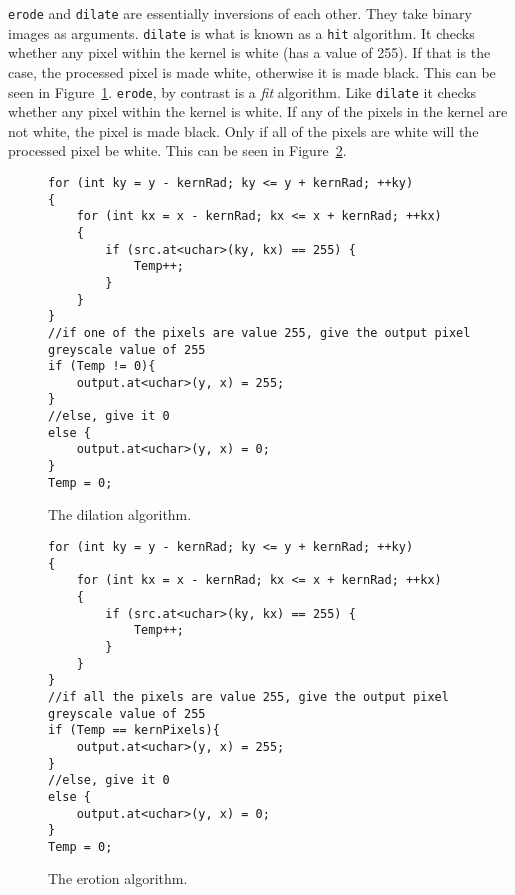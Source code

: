 \texttt{erode} and \texttt{dilate} are essentially inversions of each other. They take binary images as arguments. \texttt{dilate} is what is known as a \texttt{hit} algorithm. It checks whether any pixel within the kernel is white (has a value of 255). If that is the case, the processed pixel is made white, otherwise it is made black. This can be seen in Figure~\ref{fig:dilateAlgorith}. \texttt{erode}, by contrast is a \textit{fit} algorithm. Like \texttt{dilate} it checks whether any pixel within the kernel is white. If any of the pixels in the kernel are not white, the pixel is made black. Only if all of the pixels are white will the processed pixel be white. This can be seen in Figure~\ref{fig:erodeAlgorithm}.

\begin{figure}
\begin{lstlisting}
for (int ky = y - kernRad; ky <= y + kernRad; ++ky)
{
	for (int kx = x - kernRad; kx <= x + kernRad; ++kx)
	{
		if (src.at<uchar>(ky, kx) == 255) {
			Temp++;
		}
	}
}
//if one of the pixels are value 255, give the output pixel greyscale value of 255
if (Temp != 0){
	output.at<uchar>(y, x) = 255;
}
//else, give it 0
else {
	output.at<uchar>(y, x) = 0;
}
Temp = 0;
\end{lstlisting}
\caption{The dilation algorithm. \label{fig:dilateAlgorith}}
\end{figure}

\begin{figure}
\begin{lstlisting}
for (int ky = y - kernRad; ky <= y + kernRad; ++ky)
{
	for (int kx = x - kernRad; kx <= x + kernRad; ++kx)
	{
		if (src.at<uchar>(ky, kx) == 255) {
			Temp++;
		}
	}
}
//if all the pixels are value 255, give the output pixel greyscale value of 255
if (Temp == kernPixels){
	output.at<uchar>(y, x) = 255;
}
//else, give it 0
else {
	output.at<uchar>(y, x) = 0;
}
Temp = 0;
\end{lstlisting}
\caption{The erotion algorithm.\label{fig:erodeAlgorithm}}
\end{figure}


